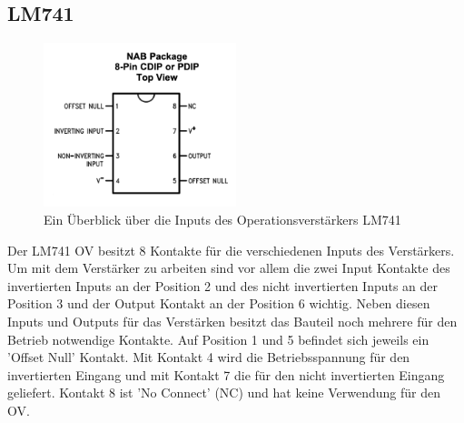     \subsection{LM741}
        \begin{figure}[H]
            \centering
            \includegraphics[width = 0.5\textwidth]{bilder/LM741.png}
            \caption{Ein Überblick über die Inputs des Operationsverstärkers LM741}
            \label{fig:LM741}
        \end{figure}
        Der LM741 OV besitzt 8 Kontakte für die verschiedenen Inputs des Verstärkers.
        Um mit dem Verstärker zu arbeiten sind vor allem die zwei Input Kontakte des invertierten Inputs an der Position 2 und des nicht invertierten Inputs an der Position 3 und der Output Kontakt an der Position 6 wichtig.
        Neben diesen Inputs und Outputs für das Verstärken besitzt das Bauteil noch mehrere für den Betrieb notwendige Kontakte.
        Auf Position 1 und 5 befindet sich jeweils ein 'Offset Null' Kontakt.
        Mit Kontakt 4 wird die Betriebsspannung für den invertierten Eingang und mit Kontakt 7 die für den nicht invertierten Eingang geliefert.
        Kontakt 8 ist 'No Connect' (NC) und hat keine Verwendung für den OV.
